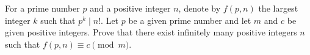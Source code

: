 For a prime number $p$ and a positive integer $n$, denote by
$f(p, n)$ the largest integer $k$ such that $p^k \mid n!$. Let $p$
be a given prime number and let $m$ and $c$ be given positive
integers. Prove that there exist infinitely many positive integers
$n$ such that $f(p, n) \equiv c \pmod m$.
